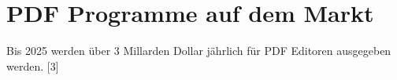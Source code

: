 \chapter{PDF Programme auf dem Markt}
Bis 2025 werden über 3 Millarden Dollar jährlich für PDF Editoren ausgegeben werden. [3]




